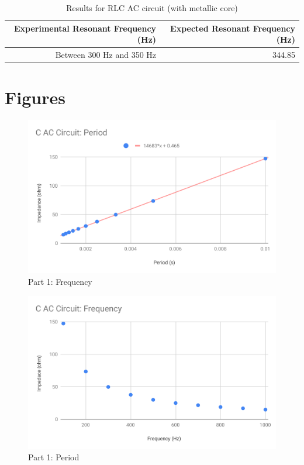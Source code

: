 \begin{table}[ht]
	\begin{center}
		\begin{tabular}{|r|r|}
			\hline
			Experimental Resonant Frequency (Hz) & Expected Resonant Frequency (Hz) \\
			\hline
			Between 300 Hz and 350 Hz & 344.85 \\
			\hline
		\end{tabular}
	\end{center}
	\caption{Results for RLC AC circuit (with metallic core)}
	\label{table.results.RLCcore}
\end{table}
%
\newpage
\FloatBarrier
\section{Figures}
%
\begin{figure}[ht]
	\centering
	\includegraphics[scale=0.74]{image/06-RLC/part-1-f.pdf}
	\caption{Part 1: Frequency}
	\label{figure.06.part.1.f}
\end{figure}
%
\begin{figure}[ht]
	\centering
	\includegraphics[scale=0.74]{image/06-RLC/part-1-T.pdf}
	\caption{Part 1: Period}
	\label{figure.06.part.1.T}
\end{figure}
